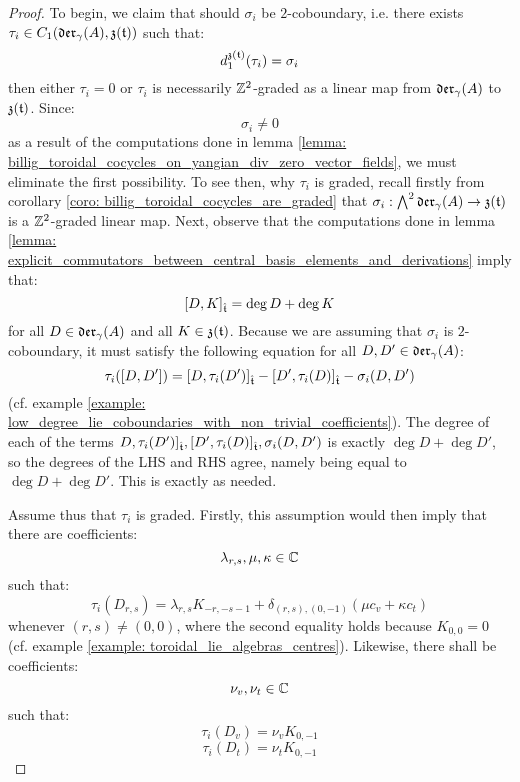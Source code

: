             \begin{proof} 
                To begin, we claim that should $\sigma_i$ be $2$-coboundary, i.e. there exists $\tau_i \in C_1(\mathfrak{der}_{\gamma}(A), \mathfrak{z}(\mathfrak{t}))$ such that:
                    $$d_1^{\mathfrak{z}(\mathfrak{t})}(\tau_i) = \sigma_i$$
                then either $\tau_i = 0$ or $\tau_i$ is necessarily $\mathbb{Z}^2$-graded as a linear map from $\mathfrak{der}_{\gamma}(A)$ to $\mathfrak{z}(\mathfrak{t})$. Since:
                    $$\sigma_i \not = 0$$
                as a result of the computations done in lemma \ref{lemma: billig_toroidal_cocycles_on_yangian_div_zero_vector_fields}, we must eliminate the first possibility. To see then, why $\tau_i$ is graded, recall firstly from corollary \ref{coro: billig_toroidal_cocycles_are_graded} that $\sigma_i: \bigwedge^2 \mathfrak{der}_{\gamma}(A) \to \mathfrak{z}(\mathfrak{t})$ is a $\mathbb{Z}^2$-graded linear map. Next, observe that the computations done in lemma \ref{lemma: explicit_commutators_between_central_basis_elements_and_derivations} imply that:
                    $$[D, K]_{\hat{\mathfrak{t}}} = \deg D + \deg K$$
                for all $D \in \mathfrak{der}_{\gamma}(A)$ and all $K \in \mathfrak{z}(\mathfrak{t})$. Because we are assuming that $\sigma_i$ is $2$-coboundary, it must satisfy the following equation for all $D, D' \in \mathfrak{der}_{\gamma}(A)$:
                    $$\tau_i([D, D']) = [D, \tau_i(D')]_{\hat{\mathfrak{t}}} - [D', \tau_i(D)]_{\hat{\mathfrak{t}}} - \sigma_i(D, D')$$
                (cf. example \ref{example: low_degree_lie_coboundaries_with_non_trivial_coefficients}). The degree of each of the terms $D, \tau_i(D')]_{\hat{\mathfrak{t}}}, [D', \tau_i(D)]_{\hat{\mathfrak{t}}}, \sigma_i(D, D')$ is exactly $\deg D + \deg D'$, so the degrees of the LHS and RHS agree, namely being equal to $\deg D + \deg D'$. This is exactly as needed.
            
                Assume thus that $\tau_i$ is graded. Firstly, this assumption would then imply that there are coefficients:
                    $$\lambda_{r, s}, \mu, \kappa \in \mathbb{C}$$
                such that:
                    $$\tau_i(D_{r, s}) = \lambda_{r, s} K_{-r, -s - 1} + \delta_{(r, s), (0, -1)} ( \mu c_v + \kappa c_t )$$
                whenever $(r, s) \not = (0, 0)$, where the second equality holds because $K_{0, 0} = 0$ (cf. example \ref{example: toroidal_lie_algebras_centres}). Likewise, there shall be coefficients:
                    $$\nu_v, \nu_t \in \mathbb{C}$$
                such that:
                    $$\tau_i(D_v) = \nu_v K_{0, -1}$$
                    $$\tau_i(D_t) = \nu_t K_{0, -1}$$


\end{proof}
